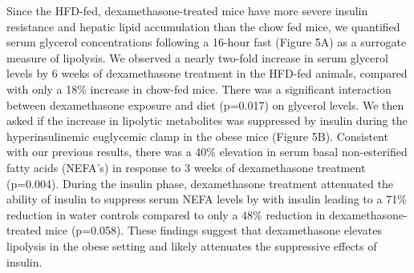 \documentclass[11pt]{article} %
\begin{document}
Since the HFD-fed, dexamethasone-treated mice have more severe insulin
resistance and hepatic lipid accumulation than the chow fed mice, we
quantified serum glycerol concentrations following a 16-hour fast
(Figure 5A) as a surrogate measure of lipolysis. We observed a nearly
two-fold increase in serum glycerol levels by 6 weeks of dexamethasone
treatment in the HFD-fed animals, compared with only a 18\% increase in
chow-fed mice. There was a significant interaction between dexamethasone
exposure and diet (p=0.017) on glycerol levels. We then asked if the
increase in lipolytic metabolites was suppressed by insulin during the
hyperinsulinemic euglycemic clamp in the obese mice (Figure 5B).
Consistent with our previous results, there was a 40\% elevation in
serum basal non-esterified fatty acids (NEFA's) in response to 3 weeks
of dexamethasone treatment (p=0.004). During the insulin phase,
dexamethasone treatment attenuated the ability of insulin to suppress
serum NEFA levels by with insulin leading to a 71\% reduction in water
controls compared to only a 48\% reduction in dexamethasone-treated mice
(p=0.058). These findings suggest that dexamethasone elevates lipolysis
in the obese setting and likely attenuates the suppressive effects of
insulin.
\end{document}
